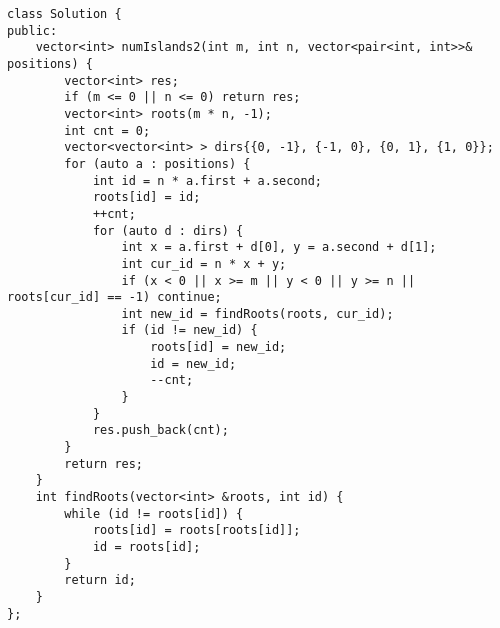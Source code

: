 \begin{lstlisting}
class Solution {
public:
    vector<int> numIslands2(int m, int n, vector<pair<int, int>>& positions) {
        vector<int> res;
        if (m <= 0 || n <= 0) return res;
        vector<int> roots(m * n, -1);
        int cnt = 0;
        vector<vector<int> > dirs{{0, -1}, {-1, 0}, {0, 1}, {1, 0}};
        for (auto a : positions) {
            int id = n * a.first + a.second;
            roots[id] = id;
            ++cnt;
            for (auto d : dirs) {
                int x = a.first + d[0], y = a.second + d[1];
                int cur_id = n * x + y;
                if (x < 0 || x >= m || y < 0 || y >= n || roots[cur_id] == -1) continue;
                int new_id = findRoots(roots, cur_id);
                if (id != new_id) {
                    roots[id] = new_id;
                    id = new_id;
                    --cnt;
                }
            }
            res.push_back(cnt);
        }
        return res;
    }
    int findRoots(vector<int> &roots, int id) {
        while (id != roots[id]) {
            roots[id] = roots[roots[id]];
            id = roots[id];
        }
        return id;
    }
};
\end{lstlisting}








